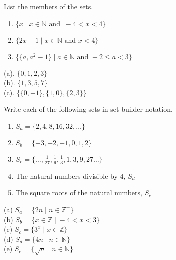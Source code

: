 \begin{questions}
 List the members of the sets.
\begin{enumerate}[label=(\alph*),itemsep=0pt,parsep=0pt,
    topsep=0pt,partopsep=0pt]
    \item $\{ x \;|\; x \in \mathbb{N} \text{ and }\ -4 < x < 4 \}$
    \item $\{ 2x+1 \;|\; x \in \mathbb{N} \text{ and } x < 4 \}$
    \item $\{ \{a, a^2-1\} \;|\; a \in \mathbb{N} \text{ and } -2 \leq a <
3\}$
\end{enumerate}
    \ifprintanswers
        \vspace{-10pt}
    \fi
    \begin{solution}
            (a). $\{0, 1, 2, 3\}$  \\
            (b). $\{1, 3, 5, 7\}$  \\
            (c). $\{\{0,-1\}, \{1,0\}, \{2,3\}\}$
    \end{solution}




 Write each of the following sets in set-builder notation. 
\begin{enumerate}[label=(\alph*),itemsep=0pt,parsep=0pt,
    topsep=0pt,partopsep=0pt]
    \item $S_a = \{ 2, 4, 8, 16, 32, \ldots \}$
    \item $S_b = \{ -3, -2, -1, 0, 1, 2 \}$
    \item $S_c = \{ \ldots, \frac{1}{27}, \frac{1}{9}, \frac{1}{3}, 1, 3, 9, 27 \ldots \}$
    \item The natural numbers divisible by 4, $S_d$
    \item The square roots of the natural numbers, $S_e$
\end{enumerate}
    \ifprintanswers
        \vspace{-10pt}
    \fi
    \begin{solution}
    (a) $S_a = \{ 2n \;|\; n \in \mathbb{Z}^+ \}$ \\
    (b) $S_b = \{ x \in \mathbb{Z} \;|\; -4 < x < 3 \}$ \\
    (c) $S_c = \{ 3^{x} \;|\; x \in \mathbb{Z} \}$ \\
    (d) $S_d = \{ 4n \;|\; n \in \mathbb{N} \}$ \\ 
    (e) $S_e = \{ \sqrt{n} \;|\; n \in \mathbb{N} \}$ 
    \end{solution}





\end{questions}
